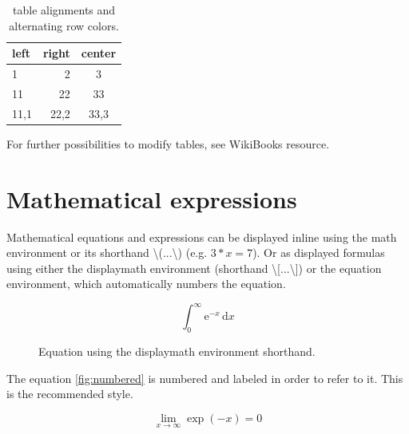 \begin{table}[ht]
\centering
\begin{tabular}{ l | r | c }
\rowcolor{gray!40}
left & right & center  \\ \hline\hline
1 & 2 & 3 \\ \hline
11 & 22 & 33 \\ \hline
11,1 & 22,2 & 33,3 \\ 
\end{tabular}
\caption{table alignments and alternating row colors.}
\label{table:alignment}
\end{table} 

For further possibilities to modify tables, see WikiBooks resource.

\section{Mathematical expressions}
Mathematical equations and expressions can be displayed inline using the math environment or its shorthand \textbackslash(...\textbackslash) (e.g. \( 3*x = 7 \)). Or as displayed formulas using either the displaymath environment (shorthand \textbackslash[...\textbackslash]) or the equation environment, which automatically numbers the equation.

\begin{figure}[h]
\[ \int_0^\infty \mathrm{e}^{-x}\,\mathrm{d}x \]
\caption{Equation using the displaymath environment shorthand.}
\label{fig:integral}
\end{figure}

The equation \ref{fig:numbered} is numbered and labeled in order to refer to it. This is the recommended style.

\begin{equation}
\lim_{x \to \infty} \exp(-x) = 0
\label{fig:numbered}
\end{equation}












